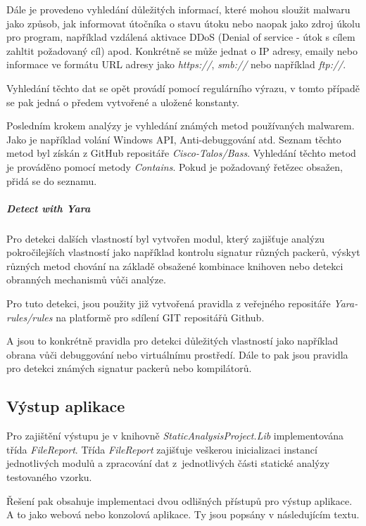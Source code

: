 Dále je provedeno vyhledání důležitých informací, které mohou sloužit malwaru jako způsob, jak informovat útočníka o stavu útoku nebo naopak jako zdroj úkolu pro program, například vzdálená aktivace DDoS (Denial of service - útok s cílem zahltit požadovaný cíl) apod. Konkrétně se může jednat o IP adresy, emaily nebo informace ve formátu URL adresy jako \emph{https://}, \emph{smb://} nebo například \emph{ftp://}.

Vyhledání těchto dat se opět provádí pomocí regulárního výrazu, v tomto případě se pak jedná o předem vytvořené a uložené konstanty.

Posledním krokem analýzy je vyhledání známých metod používaných malwarem. Jako je například volání Windows API, Anti-debuggování atd. Seznam těchto metod byl získán z GitHub repositáře \emph{Cisco-Talos/Bass}. Vyhledání těchto metod je prováděno pomocí metody \emph{Contains}. Pokud je požadovaný řetězec obsažen, přidá se do seznamu.


\subparagraph*{Detect with Yara}

Pro detekci dalších vlastností byl vytvořen modul, který zajišťuje analýzu pokročilejších vlastností jako například kontrolu signatur různých packerů, výskyt různých metod chování na základě obsažené kombinace knihoven nebo detekci obranných mechanismů vůči analýze.

Pro tuto detekci, jsou použity již vytvořená pravidla z veřejného repositáře \emph{Yara-rules/rules} na platformě pro sdílení GIT repositářů Github.

A jsou to konkrétně pravidla pro detekci důležitých vlastností jako například obrana vůči debuggování nebo virtuálnímu prostředí. Dále to pak jsou pravidla pro detekci známých signatur packerů nebo kompilátorů.

\subsection{Výstup aplikace}

Pro zajištění výstupu je v knihovně \emph{StaticAnalysisProject.Lib} implementována třída \emph{FileReport}. Třída \emph{FileReport} zajišťuje veškerou inicializaci instancí jednotlivých modulů a zpracování dat z~jednotlivých části statické analýzy testovaného vzorku.

Řešení pak obsahuje implementaci dvou odlišných přístupů pro výstup aplikace. A to jako webová nebo konzolová aplikace. Ty jsou popsány v následujícím textu.

